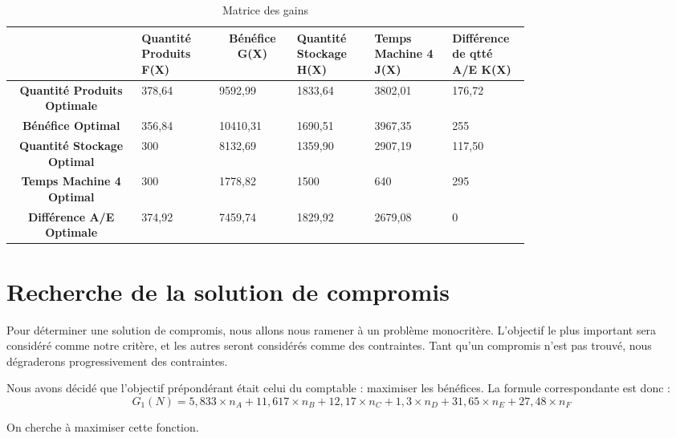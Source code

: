 \documentclass[a4paper,10pt]{article}
\begin{document}
\begin{table}[H]
\centering
\caption{Matrice des gains}
\label{tab:matgain}
\begin{tabular}{c|p{0.15\linewidth}|p{0.15\linewidth}|p{0.15\linewidth}|p{0.15\linewidth}|p{0.15\linewidth}|}
\cline{2-5}
 & \multicolumn{1}{p{0.15\linewidth}|}{\textbf{Quantité Produits F(X)}} & \multicolumn{1}{c|}{\textbf{Bénéfice G(X)}} & \multicolumn{1}{p{0.15\linewidth}|}{\textbf{Quantité Stockage H(X)}} & \multicolumn{1}{p{0.15\linewidth}|}{\textbf{Temps Machine 4 J(X)}} & \multicolumn{1}{p{0.15\linewidth}|}{\textbf{Différence de qtté A/E K(X)}} \\ \hline
\multicolumn{1}{|p{0.15\linewidth}|}{\textbf{Quantité Produits Optimale}} & 378,64 & 9592,99 & 1833,64 & 3802,01 & 176,72 \\ \hline
\multicolumn{1}{|p{0.15\linewidth}|}{\textbf{Bénéfice Optimal}} & 356,84 & 10410,31 & 1690,51 & 3967,35 & 255\\ \hline
\multicolumn{1}{|p{0.15\linewidth}|}{\textbf{Quantité Stockage Optimal}} & 300 & 8132,69 & 1359,90 & 2907,19 & 117,50\\ \hline
\multicolumn{1}{|p{0.15\linewidth}|}{\textbf{Temps Machine 4 Optimal}} & 300 & 1778,82 & 1500 & 640 & 295\\ \hline
\multicolumn{1}{|p{0.15\linewidth}|}{\textbf{Différence A/E Optimale}} & 374,92 & 7459,74 & 1829,92 & 2679,08 & 0\\ \hline

\end{tabular}
\end{table}


\section{Recherche de la solution de compromis}

Pour déterminer une solution de compromis, nous allons nous ramener à un problème monocritère. L'objectif le plus important sera considéré comme notre critère, et les autres seront considérés comme des contraintes. Tant qu'un compromis n'est pas trouvé, nous dégraderons progressivement des contraintes.

Nous avons décidé que l'objectif prépondérant était celui du comptable : maximiser les bénéfices. La formule correspondante est donc :
$$G_1(N) = 5,833 \times n_A + 11,617 \times n_B + 12,17 \times n_C + 1,3 \times n_D + 31,65 \times n_E + 27,48 \times n_F$$

On cherche à maximiser cette fonction.
\end{document}
